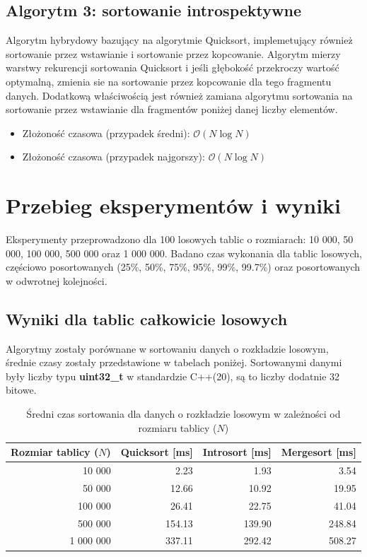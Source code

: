 \documentclass[12pt, a4paper]{article}
\begin{document}
\subsection{Algorytm 3: sortowanie introspektywne}
Algorytm hybrydowy bazujący na algorytmie Quicksort, implemetujący również sortowanie przez wstawianie i sortowanie przez kopcowanie. Algorytm mierzy warstwy rekurencji sortowania Quicksort i jeśli głębokość przekroczy wartość optymalną, zmienia sie na sortowanie przez kopcowanie dla tego fragmentu danych. Dodatkową właściwością jest również zamiana algorytmu sortowania na sortowanie przez wstawianie dla fragmentów poniżej danej liczby elementów. 
\begin{itemize}
    \item Złożoność czasowa (przypadek średni): $\mathcal{O}(N\log{N})$
    \item Złożoność czasowa (przypadek najgorszy): $\mathcal{O}(N\log{N})$
\end{itemize}

\section{Przebieg eksperymentów i wyniki}
Eksperymenty przeprowadzono dla 100 losowych tablic o rozmiarach: 10 000, 50 000, 100 000, 500 000 oraz 1 000 000. Badano czas wykonania dla tablic losowych, częściowo posortowanych (25\%, 50\%, 75\%, 95\%, 99\%, 99.7\%) oraz posortowanych w odwrotnej kolejności.

\subsection{Wyniki dla tablic całkowicie losowych}
Algorytmy zostały porównane w sortowaniu danych o rozkładzie losowym, średnie czasy zostały przedstawione w tabelach poniżej. Sortowanymi danymi były liczby typu \textbf{uint32\_t} w standardzie C++(20), są to liczby dodatnie 32 bitowe.

\begin{table}[H]
    \centering
    \label{tab:size_impact}
    \begin{tabular}{|r|r|r|r|}
        \toprule
        \textbf{Rozmiar tablicy ($N$)} & \textbf{Quicksort [ms]} & \textbf{Introsort [ms]} & \textbf{Mergesort [ms]} \\
        \midrule
        10 000      & 2.23   & 1.93   & 3.54   \\
        50 000      & 12.66  & 10.92  & 19.95  \\
        100 000     & 26.41  & 22.75  & 41.04  \\
        500 000     & 154.13 & 139.90 & 248.84 \\
        1 000 000   & 337.11 & 292.42 & 508.27 \\
        \bottomrule
    \end{tabular}
    \caption{Średni czas sortowania dla danych o rozkładzie losowym w zależności od rozmiaru tablicy ($N$)}
\end{table}
\end{document}
